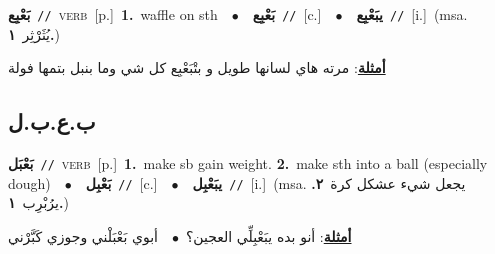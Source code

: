 \documentclass[10pt,a4paper,twoside]{article} %
\begin{document}
\begin{multicols}{2}
{\setlength\topsep{0pt}\textbf{\foreignlanguage{arabic}{بَعْبِع}}\ {\color{gray}\texttt{//}\color{black}}\ \textsc{verb}\ [p.]\ \textbf{1.}~waffle on sth\ \ $\bullet$\ \ \setlength\topsep{0pt}\textbf{\foreignlanguage{arabic}{بَعْبِع}}\ {\color{gray}\texttt{//}\color{black}}\ [c.]\ \ $\bullet$\ \ \setlength\topsep{0pt}\textbf{\foreignlanguage{arabic}{يبَعْبِع}}\ {\color{gray}\texttt{//}\color{black}}\ [i.]\ \color{gray}(msa. \foreignlanguage{arabic}{يُثَرْثِر}~\foreignlanguage{arabic}{\textbf{١.}})\color{black}\  \begin{flushright}\color{gray}\foreignlanguage{arabic}{\textbf{\underline{\foreignlanguage{arabic}{أمثلة}}}: مرته هاي لسانها طويل و بتْبَعْبِع كل شي وما بنبل بتمها فولة}\end{flushright}\color{black}} \vspace{2mm}

\vspace{-3mm}
\subsection*{\color{blue}\foreignlanguage{arabic}{ب.ع.ب.ل}\color{blue}{}} 

{\setlength\topsep{0pt}\textbf{\foreignlanguage{arabic}{بَعْبَل}}\ {\color{gray}\texttt{//}\color{black}}\ \textsc{verb}\ [p.]\ \textbf{1.}~make sb gain weight.  \textbf{2.}~make sth into a ball (especially dough)\ \ $\bullet$\ \ \setlength\topsep{0pt}\textbf{\foreignlanguage{arabic}{بَعْبِل}}\ {\color{gray}\texttt{//}\color{black}}\ [c.]\ \ $\bullet$\ \ \setlength\topsep{0pt}\textbf{\foreignlanguage{arabic}{يبَعْبِل}}\ {\color{gray}\texttt{//}\color{black}}\ [i.]\ \color{gray}(msa. \foreignlanguage{arabic}{يجعل شيء عشكل كرة}~\foreignlanguage{arabic}{\textbf{٢.}}  \foreignlanguage{arabic}{يرُبْرِب}~\foreignlanguage{arabic}{\textbf{١.}})\color{black}\  \begin{flushright}\color{gray}\foreignlanguage{arabic}{\textbf{\underline{\foreignlanguage{arabic}{أمثلة}}}: أنو بده يبَعْبِلِّي العجين؟\ $\bullet$\ \  أبوي بَعْبَلْني وجوزي كَبَّرْني}\end{flushright}\color{black}} \vspace{2mm}


\end{multicols}
\end{document}
